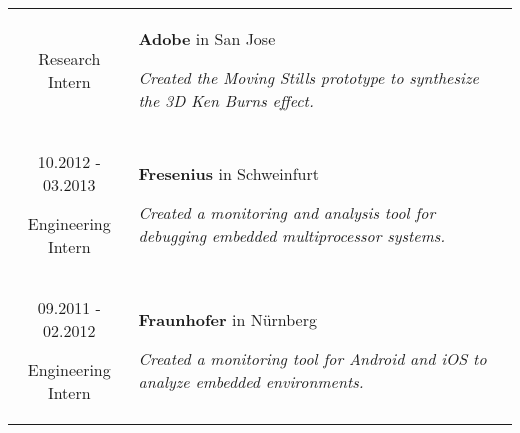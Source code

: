 \documentclass[10pt]{article}
\begin{document}
\begin{tabular}{C Z D}
{		\vspace{-0.05cm}
		
		{\scriptsize Research Intern}
	}
	&
	{	
		{\bf Adobe} {\scriptsize in San Jose}

		\vspace{0.05cm}

		{\scriptsize \it Created the Moving Stills prototype to synthesize the 3D Ken Burns effect.}
		
		\vspace{0.0cm}
	}
	\\
	{
		10.2012 - 03.2013
		
		\vspace{-0.05cm}
		
		{\scriptsize Engineering Intern}
	}
	&
	{	
		{\bf Fresenius} {\scriptsize in Schweinfurt}
		
		\vspace{0.05cm}
		
		{\scriptsize \it Created a monitoring and analysis tool for debugging embedded multiprocessor systems.}
		
		\vspace{0.0cm}
	}
	\\
	{
		09.2011 - 02.2012
		
		\vspace{-0.05cm}
		
		{\scriptsize Engineering Intern}
	}
	&
	{	
		{\bf Fraunhofer} {\scriptsize in N{\"u}rnberg}
		
		\vspace{0.05cm}
		
		{\scriptsize \it Created a monitoring tool for Android and iOS to analyze embedded environments.}
	}
	\\
\end{tabular}
\end{document}
